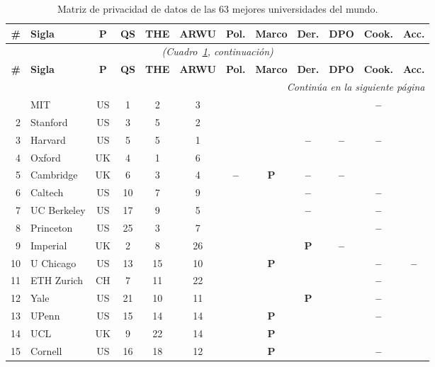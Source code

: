 \documentclass[11pt,a4paper]{article}
\newcommand{\si}{\ding{51}}
\newcommand{\no}{\textcolor{gris}{\textbf{--}}}
\newcommand{\pc}{\textbf{P}}
\begin{document}
\footnotesize
\begin{longtable}{@{}r l c c c c c c c c c c@{}}
	\caption{Matriz de privacidad de datos de las 63 mejores universidades del mundo.}\label{tab:mundo}\\
	\toprule
	\textbf{\#} & \textbf{Sigla} & \textbf{P} & \textbf{QS} & \textbf{THE} & \textbf{ARWU} & \textbf{Pol.} & \textbf{Marco} & \textbf{Der.} & \textbf{DPO} & \textbf{Cook.} & \textbf{Acc.} \\
	\midrule
	\endfirsthead
	\multicolumn{12}{c}{\textit{(Cuadro~\ref{tab:mundo}, continuaci\'on)}}\\
	\toprule
	\textbf{\#} & \textbf{Sigla} & \textbf{P} & \textbf{QS} & \textbf{THE} & \textbf{ARWU} & \textbf{Pol.} & \textbf{Marco} & \textbf{Der.} & \textbf{DPO} & \textbf{Cook.} & \textbf{Acc.} \\
	\midrule
	\endhead
	\midrule
	\multicolumn{12}{r}{\textit{Contin\'ua en la siguiente p\'agina}}\\
	\endfoot
	\bottomrule
	\endlastfoot
	1 & MIT & US & 1 & 2 & 3 & \si & \si & \si & \si & \no & \si \\
	2 & Stanford & US & 3 & 5 & 2 & \si & \si & \si & \si & \si & \si \\
	3 & Harvard & US & 5 & 5 & 1 & \si & \si & \no & \no & \no & \si \\
	4 & Oxford & UK & 4 & 1 & 6 & \si & \si & \si & \si & \si & \si \\
	5 & Cambridge & UK & 6 & 3 & 4 & \no & \pc & \no & \no & \si & \si \\
	6 & Caltech & US & 10 & 7 & 9 & \si & \si & \no & \si & \no & \si \\
	7 & UC Berkeley & US & 17 & 9 & 5 & \si & \si & \no & \si & \no & \si \\
	8 & Princeton & US & 25 & 3 & 7 & \si & \si & \si & \si & \no & \si \\
	9 & Imperial & UK & 2 & 8 & 26 & \si & \si & \pc & \no & \si & \si \\
	10 & U Chicago & US & 13 & 15 & 10 & \si & \pc & \si & \si & \no & \no \\
	11 & ETH Zurich & CH & 7 & 11 & 22 & \si & \si & \si & \si & \no & \si \\
	12 & Yale & US & 21 & 10 & 11 & \si & \si & \pc & \si & \no & \si \\
	13 & UPenn & US & 15 & 14 & 14 & \si & \pc & \si & \si & \no & \si \\
	14 & UCL & UK & 9 & 22 & 14 & \si & \pc & \si & \si & \si & \si \\
	15 & Cornell & US & 16 & 18 & 12 & \si & \pc & \si & \si & \no & \si \\

\end{longtable}
\end{document}
